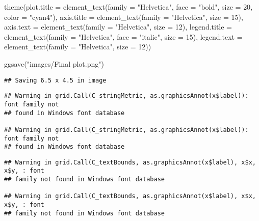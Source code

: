 \documentclass[
]{book}
\newenvironment{Shaded}{\begin{snugshade}}{\end{snugshade}}
\newcommand{\AttributeTok}[1]{\textcolor[rgb]{0.77,0.63,0.00}{#1}}
\newcommand{\DecValTok}[1]{\textcolor[rgb]{0.00,0.00,0.81}{#1}}
\newcommand{\FunctionTok}[1]{\textcolor[rgb]{0.00,0.00,0.00}{#1}}
\newcommand{\NormalTok}[1]{#1}
\newcommand{\StringTok}[1]{\textcolor[rgb]{0.31,0.60,0.02}{#1}}
\begin{document}
\begin{Shaded}
\begin{Highlighting}[]
    \FunctionTok{theme}\NormalTok{(}\AttributeTok{plot.title =} \FunctionTok{element\_text}\NormalTok{(}\AttributeTok{family =} \StringTok{"Helvetica"}\NormalTok{, }\AttributeTok{face =} \StringTok{"bold"}\NormalTok{, }\AttributeTok{size =} \DecValTok{20}\NormalTok{, }\AttributeTok{color =} \StringTok{"cyan4"}\NormalTok{),}
          \AttributeTok{axis.title =} \FunctionTok{element\_text}\NormalTok{(}\AttributeTok{family =} \StringTok{"Helvetica"}\NormalTok{, }\AttributeTok{size =} \DecValTok{15}\NormalTok{),}
          \AttributeTok{axis.text =} \FunctionTok{element\_text}\NormalTok{(}\AttributeTok{family =} \StringTok{"Helvetica"}\NormalTok{, }\AttributeTok{size =} \DecValTok{12}\NormalTok{),}
          \AttributeTok{legend.title =} \FunctionTok{element\_text}\NormalTok{(}\AttributeTok{family =} \StringTok{"Helvetica"}\NormalTok{, }\AttributeTok{face =} \StringTok{"italic"}\NormalTok{, }\AttributeTok{size =} \DecValTok{15}\NormalTok{), }
          \AttributeTok{legend.text =} \FunctionTok{element\_text}\NormalTok{(}\AttributeTok{family =} \StringTok{"Helvetica"}\NormalTok{, }\AttributeTok{size =} \DecValTok{12}\NormalTok{))}
\end{Highlighting}
\end{Shaded}

\begin{Shaded}
\begin{Highlighting}[]
\FunctionTok{ggsave}\NormalTok{(}\StringTok{"images/Final plot.png"}\NormalTok{)}
\end{Highlighting}
\end{Shaded}

\begin{verbatim}
## Saving 6.5 x 4.5 in image
\end{verbatim}

\begin{verbatim}
## Warning in grid.Call(C_stringMetric, as.graphicsAnnot(x$label)): font family not
## found in Windows font database

## Warning in grid.Call(C_stringMetric, as.graphicsAnnot(x$label)): font family not
## found in Windows font database
\end{verbatim}

\begin{verbatim}
## Warning in grid.Call(C_textBounds, as.graphicsAnnot(x$label), x$x, x$y, : font
## family not found in Windows font database

## Warning in grid.Call(C_textBounds, as.graphicsAnnot(x$label), x$x, x$y, : font
## family not found in Windows font database
\end{verbatim}
\end{document}
